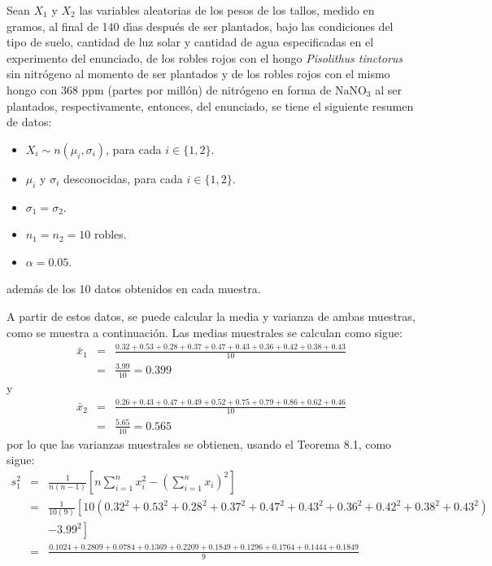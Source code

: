 \begin{solucion}
 Sean $X_1$ y $X_2$ las variables aleatorias de los pesos de los tallos, medido en gramos, al final de 140 d\'{\i}as despu\'es de ser plantados, bajo las condiciones del tipo de suelo, cantidad de luz solar y cantidad de agua especificadas en el experimento del enunciado, de los robles rojos con el hongo \textit{Pisolithus tinctorus} sin nitr\'ogeno al momento de ser plantados y de los robles rojos con el mismo hongo con 368 ppm (partes por mill\'on) de nitr\'ogeno en forma de $\text{NaNO}_3$ al ser plantados, respectivamente, entonces, del enunciado, se tiene el siguiente resumen de datos:
 \begin{itemize}
  \item $X_i \sim n(\mu_i, \sigma_i)$, para cada $i \in \{ 1, 2 \}$.
  \item $\mu_i$ y $\sigma_i$ desconocidas, para cada $i \in \{ 1, 2 \}$.
  \item $\sigma_1 = \sigma_2$.
  \item $n_1 = n_2 = 10$ robles.
  \item $\alpha = 0.05$.
 \end{itemize}
 adem\'as de los 10 datos obtenidos en cada muestra.
 \par 
 A partir de estos datos, se puede calcular la media y varianza de ambas muestras, como se muestra a continuaci\'on. Las medias muestrales se calculan como sigue:
 \begin{eqnarray*}
  \bar{x}_1 & = & \frac{0.32 + 0.53 + 0.28 + 0.37 + 0.47 + 0.43 + 0.36 + 0.42 + 0.38 + 0.43}{10} \\
  & = & \frac{3.99}{10} = 0.399
 \end{eqnarray*}
 y 
 \begin{eqnarray*}
  \bar{x}_2 & = & \frac{0.26 + 0.43 + 0.47 + 0.49 + 0.52 + 0.75 + 0.79 + 0.86 + 0.62 + 0.46}{10} \\
  & = & \frac{5.65}{10} = 0.565
 \end{eqnarray*}
 por lo que las varianzas muestrales se obtienen, usando el Teorema 8.1, como sigue:
  \begin{eqnarray*}
  s^2_1 & = & \frac{1}{n(n-1)} \left[ n\sum_{i=1}^n x_i^2 - \left( \sum_{i=1}^n x_i \right)^2 \right] \\
  & = & \frac{1}{10(9)} \left[ 10\left( 0.32^2 + 0.53^2 + 0.28^2 + 0.37^2 + 0.47^2 + 0.43^2 + 0.36^2 + 0.42^2 + 0.38^2 + 0.43^2 \right) \right. \\
  & & \left. - 3.99^2 \right] \\
  & = & \frac{0.1024 + 0.2809 + 0.0784 + 0.1369 + 0.2209 + 0.1849 + 0.1296 + 0.1764 + 0.1444 + 0.1849}{9} \\

\end{eqnarray*}
\end{solucion}

